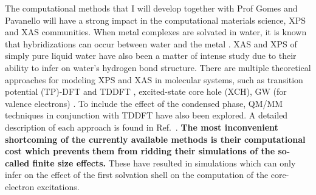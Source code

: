 \documentclass[notitlepage,12pt]{report}
\begin{document}
    The computational methods that I will develop together with Prof Gomes and Pavanello will have a strong impact in the computational materials science,  XPS and XAS communities. When metal complexes are solvated in water, it is known that hybridizations can occur between water and the metal \supercite{N_slund_2003}.  XAS and XPS of simply pure liquid water have also been a matter of intense study \supercite{fransson2016x} due to their ability to infer on water's hydrogen bond structure. There are multiple theoretical approaches for modeling XPS and XAS in molecular systems, such as transition potential (TP)-DFT  and TDDFT \supercite{triguero1998calculations}, excited-state core hole (XCH)\supercite{prendergast2006x}, GW (for valence electrons) \supercite{vinson2012theoretical,chen2010x}. To include the effect of the condensed phase, QM/MM techniques in conjunction with TDDFT have also been explored.\supercite{list2014lanczos} A detailed description of each approach is found in Ref.\ \cite{fransson2016x}. {\bf The most inconvenient shortcoming of the currently available methods is their computational cost which prevents them from ridding their simulations of the so-called finite size effects.} These have resulted in simulations which can only infer on the effect of the first solvation shell on the computation of the core-electron excitations\supercite{de2021environment}. 
\end{document}

